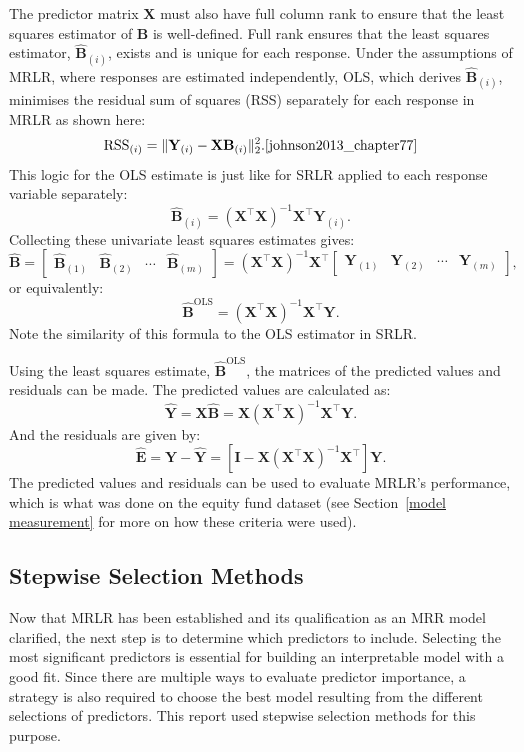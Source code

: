 \documentclass[11pt]{report} %
\begin{document}
The predictor matrix \( \mathbf{X} \) must also have full column rank to ensure that the least squares estimator of \( \mathbf{B} \) is well-defined. Full rank ensures that the least squares estimator, $\mathbf{\hat{B}}_{(i)}$, exists and is unique for each response. Under the assumptions of MRLR, where responses are estimated independently, OLS, which derives $\hat{\mathbf{B}}_{(i)}$, minimises the residual sum of squares (RSS) separately for each response in MRLR as shown here:
\[
\text{RSS}_{(i)} = \| \mathbf{Y}_{(i)} - \mathbf{X} \mathbf{B}_{(i)} \|_2^2.\cite{johnson2013_chapter77}
\]
This logic for the OLS estimate is just like for SRLR applied to each response variable separately:
\[
\hat{\mathbf{B}}_{(i)} = (\mathbf{X}^\top \mathbf{X})^{-1} \mathbf{X}^\top \mathbf{Y}_{(i)}.
\]
Collecting these univariate least squares estimates gives:
\[
\hat{\mathbf{B}} = 
\begin{bmatrix}
\hat{\mathbf{B}}_{(1)} & \hat{\mathbf{B}}_{(2)} & \cdots & \hat{\mathbf{B}}_{(m)}
\end{bmatrix}
= (\mathbf{X}^\top \mathbf{X})^{-1} \mathbf{X}^\top
\begin{bmatrix}
\mathbf{Y}_{(1)} & \mathbf{Y}_{(2)} & \cdots & \mathbf{Y}_{(m)}
\end{bmatrix},
\]
or equivalently:
\[
\hat{\mathbf{B}}^\text{OLS} = (\mathbf{X}^\top \mathbf{X})^{-1} \mathbf{X}^\top \mathbf{Y}
.\]
Note the similarity of this formula to the OLS estimator in SRLR.

Using the least squares estimate, $\hat{\mathbf{B}}^\text{OLS}$, the matrices of the predicted values and residuals can be made.\cite{johnson2013_chapter77} The predicted values are calculated as:
\[
\hat{\mathbf{Y}} = \mathbf{X} \hat{\mathbf{B}} = \mathbf{X}(\mathbf{X}^\top\mathbf{X})^{-1}\mathbf{X}^\top\mathbf{Y}.
\]
And the residuals are given by:
\[
\hat{\mathbf{E}} = \mathbf{Y} - \hat{\mathbf{Y}} = [\mathbf{I} - \mathbf{X}(\mathbf{X}^\top\mathbf{X})^{-1}\mathbf{X}^\top]\mathbf{Y}.
\]
The predicted values and residuals can be used to evaluate MRLR's performance, which is what was done on the equity fund dataset (see Section~\ref{model measurement} for more on how these criteria were used).

\vspace{-0.3cm}
\subsection{Stepwise Selection Methods}
\label{stepwise-selection}
Now that MRLR has been established and its qualification as an MRR model clarified, the next step is to determine which predictors to include. Selecting the most significant predictors is essential for building an interpretable model with a good fit. Since there are multiple ways to evaluate predictor importance, a strategy is also required to choose the best model resulting from the different selections of predictors. This report used stepwise selection methods for this purpose.
\end{document}
